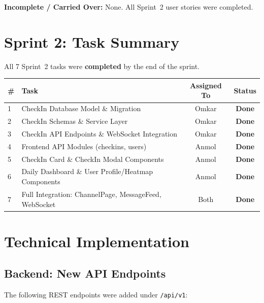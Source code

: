 \documentclass[11pt]{article}
\begin{document}
\textbf{Incomplete / Carried Over:} None. All Sprint~2 user stories were completed.

\section{Sprint 2: Task Summary}

All 7 Sprint~2 tasks were \textbf{completed} by the end of the sprint.

\begin{center}
\begin{tabularx}{\textwidth}{@{}lXcc@{}}
\toprule
\textbf{\#} & \textbf{Task} & \textbf{Assigned To} & \textbf{Status} \\
\midrule
1 & CheckIn Database Model \& Migration & Omkar & \textbf{Done} \\
2 & CheckIn Schemas \& Service Layer & Omkar & \textbf{Done} \\
3 & CheckIn API Endpoints \& WebSocket Integration & Omkar & \textbf{Done} \\
4 & Frontend API Modules (checkins, users) & Anmol & \textbf{Done} \\
5 & CheckIn Card \& CheckIn Modal Components & Anmol & \textbf{Done} \\
6 & Daily Dashboard \& User Profile/Heatmap Components & Anmol & \textbf{Done} \\
7 & Full Integration: ChannelPage, MessageFeed, WebSocket & Both & \textbf{Done} \\
\bottomrule
\end{tabularx}
\end{center}

\section{Technical Implementation}

\subsection{Backend: New API Endpoints}

The following REST endpoints were added under \texttt{/api/v1}:
\end{document}
